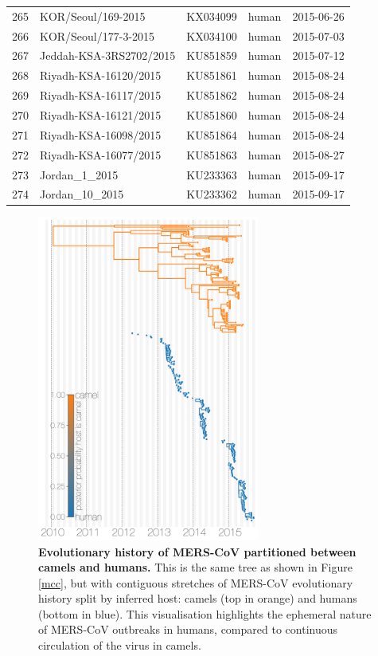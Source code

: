 \documentclass[9pt,lineno]{elife}
\begin{document}
\begin{longtable}{ | r | l | p{2cm} | l | l | }
  265 & KOR/Seoul/169-2015 & KX034099 & human & 2015-06-26 \\
  266 & KOR/Seoul/177-3-2015 & KX034100 & human & 2015-07-03 \\
  267 & Jeddah-KSA-3RS2702/2015 & KU851859 & human & 2015-07-12 \\
  268 & Riyadh-KSA-16120/2015 & KU851861 & human & 2015-08-24 \\
  269 & Riyadh-KSA-16117/2015 & KU851862 & human & 2015-08-24 \\
  270 & Riyadh-KSA-16121/2015 & KU851860 & human & 2015-08-24 \\
  271 & Riyadh-KSA-16098/2015 & KU851864 & human & 2015-08-24 \\
  272 & Riyadh-KSA-16077/2015 & KU851863 & human & 2015-08-27 \\
  273 & Jordan\_1\_2015 & KU233363 & human & 2015-09-17 \\
  274 & Jordan\_10\_2015 & KU233362 & human & 2015-09-17 \\
\end{longtable}

\begin{figure}[h]
\centering
	\includegraphics[width=0.65\textwidth]{figures/mers_exploded.png}
	\caption{\textbf{Evolutionary history of MERS-CoV partitioned between camels and humans.}
This is the same tree as shown in Figure \ref{mcc}, but with contiguous stretches of MERS-CoV evolutionary history split by inferred host: camels (top in orange) and humans (bottom in blue).
This visualisation highlights the ephemeral nature of MERS-CoV outbreaks in humans, compared to continuous circulation of the virus in camels.
	}
	\label{exploded}
\end{figure}
\end{document}
